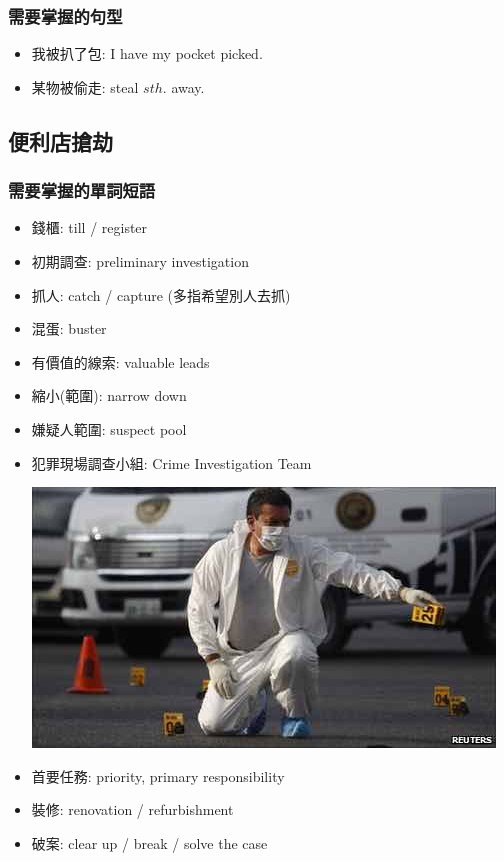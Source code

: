 \subsubsection*{需要掌握的句型}
\begin{multicols}{2}
\begin{itemize}
  \itemsep0em
  \item 我被扒了包: I have my pocket picked.
  \item 某物被偷走: steal $sth.$ away.
\end{itemize}
\end{multicols}

\subsection{便利店搶劫}
\subsubsection*{需要掌握的單詞短語}
\begin{multicols}{2}
\begin{itemize}
  \itemsep0em
  \item 錢櫃: till / register
  \item 初期調查: preliminary investigation
  \item 抓人: catch / capture (多指希望別人去抓)
  \item 混蛋: buster
  \item 有價值的線索: valuable leads
  \item 縮小(範圍): narrow down
  \item 嫌疑人範圍: suspect pool
  \item 犯罪現場調查小組: Crime  Investigation Team
  \begin{center}
    \includegraphics[scale=.48]{pics/csi-team}
  \end{center}
  \item 首要任務: priority, primary responsibility
  \item 裝修: renovation / refurbishment
  \item 破案: clear up / break / solve the case
\end{itemize}
\end{multicols}

